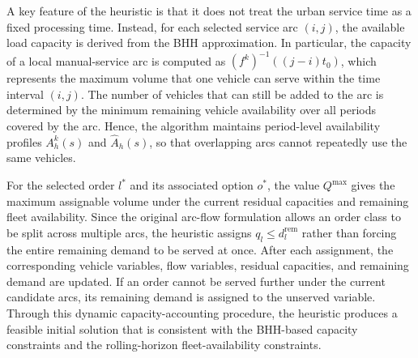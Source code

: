 \documentclass[10pt, reqno]{amsart}
\begin{document}
A key feature of the heuristic is that it does not treat the urban service time as a fixed processing time. Instead, for each selected service arc $(i,j)$, the available load capacity is derived from the BHH approximation. In particular, the capacity of a local manual-service arc is computed as $(f^k)^{-1}((j-i)t_0)$, which represents the maximum volume that one vehicle can serve within the time interval $(i,j)$. The number of vehicles that can still be added to the arc is determined by the minimum remaining vehicle availability over all periods covered by the arc. Hence, the algorithm maintains period-level availability profiles $A_h^k(s)$ and $\widehat A_h(s)$, so that overlapping arcs cannot repeatedly use the same vehicles.

For the selected order $l^*$ and its associated option $o^*$, the value $Q^{\max}$ gives the maximum assignable volume under the current residual capacities and remaining fleet availability. Since the original arc-flow formulation allows an order class to be split across multiple arcs, the heuristic assigns $q_l\le d_l^{\mathrm{rem}}$ rather than forcing the entire remaining demand to be served at once. After each assignment, the corresponding vehicle variables, flow variables, residual capacities, and remaining demand are updated. If an order cannot be served further under the current candidate arcs, its remaining demand is assigned to the unserved variable. Through this dynamic capacity-accounting procedure, the heuristic produces a feasible initial solution that is consistent with the BHH-based capacity constraints and the rolling-horizon fleet-availability constraints.

\printbibliography
\end{document}
